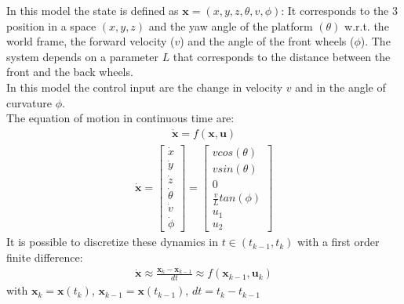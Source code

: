 In this model the state is defined as $\boldsymbol{x} = (x, y, z,\theta , v, \phi)$:
It corresponds to the 3 position in a space $(x,y,z)$ and the yaw angle of the platform $(\theta)$ w.r.t. the world frame, the forward velocity ($v$) and the angle of the front wheels ($\phi$). The system depends on a parameter $L$ that corresponds to the distance between the front and the back wheels.\\
In this model the control input are the change in velocity $v$ and in the angle of curvature $\phi$. \\
The equation of motion in continuous time are:
\begin{align}
\boldsymbol{\dot{x}} = f(\boldsymbol{x},\boldsymbol{u}) \nonumber
\end{align}
\begin{align}
\boldsymbol{\dot{x}} = 
\begin{bmatrix}
\dot{x}  \\[10pt]
\dot{y}  \\[10pt]
\dot{z} \\[10pt]
\dot{\theta} \\[10pt]
\dot{v}  \\[10pt]
\dot{\phi}
\end{bmatrix}
= 
\begin{bmatrix}
v cos(\theta) \\[10pt]
v sin(\theta) \\[10pt]
 0 \\[10pt]
\frac{v}{L}tan(\phi)\\[10pt]
u_1 \\[10pt]
 u_2 
\end{bmatrix}
\label{eq:equation_nonholonomic_continuos}
\end{align}
It is possible to discretize these dynamics in $t \in (t_{k-1}, t_k)$ with a first order finite difference:
\begin{align}
\boldsymbol{\dot{x}} \approx \frac{\boldsymbol{x}_k - \boldsymbol{x}_{k-1} }{dt} \approx f(\boldsymbol{x}_{k-1},\boldsymbol{u}_k) \nonumber
\end{align}
with $\boldsymbol{x}_k = \boldsymbol{x}(t_k)$, $\boldsymbol{x}_{k-1} = \boldsymbol{x}(t_{k-1})$, $dt = t_k - t_{k-1}$
